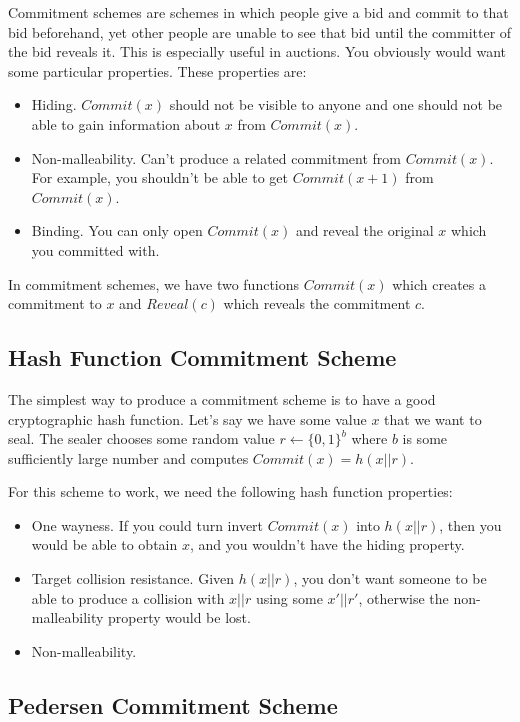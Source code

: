 \documentclass[psamsfonts]{amsart}
\begin{document}
Commitment schemes are schemes in which people give a bid and commit to that bid beforehand, yet other people are unable to see that bid until the committer of the bid reveals it. This is especially useful in auctions. You obviously would want some particular properties. These properties are:
\begin{itemize}
  \item Hiding. $Commit(x)$ should not be visible to anyone and one should not be able to gain information about $x$ from $Commit(x)$.
  \item Non-malleability. Can't produce a related commitment from $Commit(x)$. For example, you shouldn't be able to get $Commit(x+1)$ from $Commit(x)$.
  \item Binding. You can only open $Commit(x)$ and reveal the original $x$ which you committed with.
\end{itemize}

In commitment schemes, we have two functions $Commit(x)$ which creates a commitment to $x$ and $Reveal(c)$ which reveals the commitment $c$.

\subsection{Hash Function Commitment Scheme}

The simplest way to produce a commitment scheme is to have a good cryptographic hash function. Let's say we have some value $x$ that we want to seal. The sealer chooses some random value $r \leftarrow \{0,1\}^{b}$ where $b$ is some sufficiently large number and computes $Commit(x) = h(x || r)$.

For this scheme to work, we need the following hash function properties:
\begin{itemize}
  \item One wayness. If you could turn invert $Commit(x)$ into $h(x || r)$, then you would be able to obtain $x$, and you wouldn't have the hiding property.
  \item Target collision resistance. Given $h(x || r)$, you don't want someone to be able to produce a collision with $x || r$ using some $x' || r'$, otherwise the non-malleability property would be lost.
  \item Non-malleability.
\end{itemize}

\subsection{Pedersen Commitment Scheme}
\end{document}
